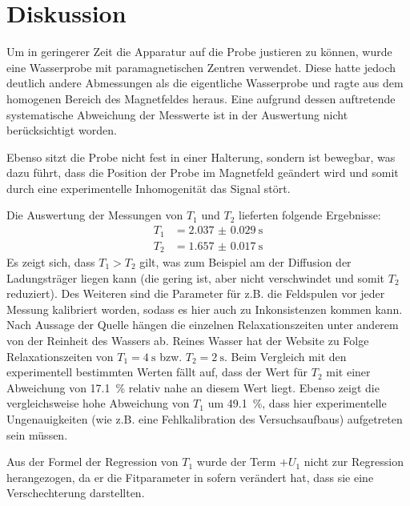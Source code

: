 \section{Diskussion}
\label{sec:Diskussion}

Um in geringerer Zeit die Apparatur auf die Probe justieren zu können,
wurde eine Wasserprobe mit paramagnetischen Zentren verwendet.
Diese hatte jedoch deutlich andere Abmessungen als die eigentliche Wasserprobe
und ragte aus dem homogenen Bereich des Magnetfeldes heraus.
Eine aufgrund dessen auftretende systematische Abweichung der Messwerte ist in der
Auswertung nicht berücksichtigt worden.

Ebenso sitzt die Probe nicht fest in einer Halterung, sondern ist bewegbar, was
dazu führt, dass die Position der Probe im Magnetfeld geändert wird und somit durch
eine experimentelle Inhomogenität das Signal stört.


Die Auswertung der Messungen von $T_1$ und $T_2$ lieferten folgende Ergebnisse:
\begin{align*}
  T_1 &= \SI{2.037(29)}{\second} \\
  T_2 &= \SI{1.657(17)}{\second}
\end{align*}
Es zeigt sich, dass $T_1 > T_2$ gilt,
was zum Beispiel am der Diffusion der Ladungsträger liegen kann (die gering ist,
aber nicht verschwindet und somit $T_2$ reduziert).
Des Weiteren sind die Parameter für z.B. die Feldspulen vor jeder Messung kalibriert
worden, sodass es hier auch zu Inkonsistenzen kommen kann.
Nach Aussage der Quelle \cite{QAMRI} hängen die einzelnen Relaxationszeiten
unter anderem von der Reinheit des Wassers ab.
Reines Wasser hat der Website zu Folge Relaxationszeiten von
$T_1 = \SI{4}{\second}$ bzw. $T_2 = \SI{2}{\second}$.
Beim Vergleich mit den experimentell bestimmten Werten fällt auf, dass der
Wert für $T_2$ mit einer Abweichung von \SI{17.1}{\percent} relativ
nahe an diesem Wert liegt.
Ebenso zeigt die vergleichsweise hohe Abweichung von $T_1$ um \SI{49.1}{\percent},
dass hier experimentelle Ungenauigkeiten (wie z.B. eine Fehlkalibration des
Versuchsaufbaus) aufgetreten sein müssen.

Aus der Formel der Regression von $T_1$ wurde der Term $+ U_1$ nicht zur Regression
herangezogen, da er die Fitparameter in sofern verändert hat, dass sie eine
Verschechterung darstellten.

